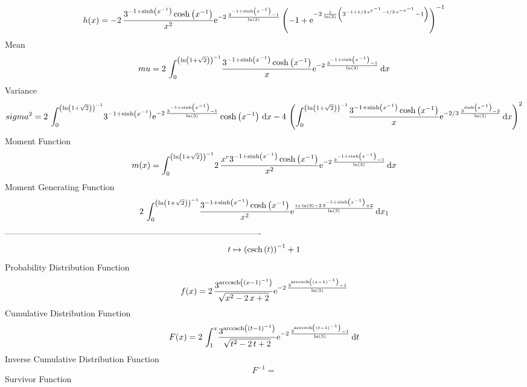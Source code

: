 \documentclass[12pt]{article}
\begin{document}
 $$ h(x)=-2\,{\frac {{3}^{-1+\sinh \left( {x}^{-1} \right) }\cosh \left( {x}^{-
1} \right) }{{x}^{2}}{{\rm e}^{-2\,{\frac {{3}^{-1+\sinh \left( {x}^{-
1} \right) }-1}{\ln  \left( 3 \right) }}}} \left( -1+{{\rm e}^{-2\,{
\frac {1}{\ln  \left( 3 \right) } \left( {3}^{-1+1/2\,{{\rm e}^{{x}^{-
1}}}-1/2\,{{\rm e}^{-{x}^{-1}}}}-1 \right) }}} \right) ^{-1}}
$$Mean 
 $$ mu=2\,\int_{0}^{ \left( \ln  \left( 1+\sqrt {2} \right)  \right) ^{-1}}\!
{\frac {{3}^{-1+\sinh \left( {x}^{-1} \right) }\cosh \left( {x}^{-1}
 \right) }{x}{{\rm e}^{-2\,{\frac {{3}^{-1+\sinh \left( {x}^{-1}
 \right) }-1}{\ln  \left( 3 \right) }}}}}\,{\rm d}x
$$ Variance 
 $$ sigma^2 = 2\,\int_{0}^{ \left( \ln  \left( 1+\sqrt {2} \right)  \right) ^{-1}}\!
{3}^{-1+\sinh \left( {x}^{-1} \right) }{{\rm e}^{-2\,{\frac {{3}^{-1+
\sinh \left( {x}^{-1} \right) }-1}{\ln  \left( 3 \right) }}}}\cosh
 \left( {x}^{-1} \right) \,{\rm d}x-4\, \left( \int_{0}^{ \left( \ln 
 \left( 1+\sqrt {2} \right)  \right) ^{-1}}\!{\frac {{3}^{-1+\sinh
 \left( {x}^{-1} \right) }\cosh \left( {x}^{-1} \right) }{x}{{\rm e}^{
-2/3\,{\frac {{3}^{\sinh \left( {x}^{-1} \right) }-3}{\ln  \left( 3
 \right) }}}}}\,{\rm d}x \right) ^{2}
$$Moment Function 
 $$ m(x) = \int_{0}^{ \left( \ln  \left( 1+\sqrt {2} \right)  \right) ^{-1}}\!2\,
{\frac {{x}^{r}{3}^{-1+\sinh \left( {x}^{-1} \right) }\cosh \left( {x}
^{-1} \right) }{{x}^{2}}{{\rm e}^{-2\,{\frac {{3}^{-1+\sinh \left( {x}
^{-1} \right) }-1}{\ln  \left( 3 \right) }}}}}\,{\rm d}x
$$ Moment Generating Function 
 $$2\,\int_{0}^{ \left( \ln  \left( 1+\sqrt {2} \right)  \right) ^{-1}}\!
{\frac {{3}^{-1+\sinh \left( {x}^{-1} \right) }\cosh \left( {x}^{-1}
 \right) }{{x}^{2}}{{\rm e}^{{\frac {tx\ln  \left( 3 \right) -2\,{3}^{
-1+\sinh \left( {x}^{-1} \right) }+2}{\ln  \left( 3 \right) }}}}}
\,{\rm d}x_{{1}}
$$-------------------------------------------------------------------------------------------  \\$$t\mapsto  \left( {\rm csch} \left(t\right) \right) ^{-1}+1
$$Probability Distribution Function 
$$  f(x)=2\,{\frac {{3}^{{\rm arccsch} \left( \left( x-1 \right) ^{-1}\right)}
}{\sqrt {{x}^{2}-2\,x+2}}{{\rm e}^{-2\,{\frac {{3}^{{\rm arccsch} 
\left( \left( x-1 \right) ^{-1}\right)}-1}{\ln  \left( 3 \right) }}}}}
$$Cumulative Distribution Function  
 $$F(x)=2\,\int_{1}^{x}\!{\frac {{3}^{{\rm arccsch} \left( \left( t-1 \right) 
^{-1}\right)}}{\sqrt {{t}^{2}-2\,t+2}}{{\rm e}^{-2\,{\frac {{3}^{
{\rm arccsch} \left( \left( t-1 \right) ^{-1}\right)}-1}{\ln  \left( 3
 \right) }}}}}\,{\rm d}t
$$ Inverse Cumulative Distribution Function 
  $$F^{-1} = $$Survivor Function 
\end{document}
